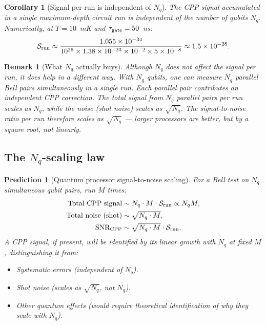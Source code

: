 \documentclass[11pt,letterpaper]{article}
\newtheorem{corollary}[theorem]{Corollary}
\newtheorem{remark}[theorem]{Remark}
\newtheorem{prediction}[theorem]{Prediction}
\begin{document}
\begin{corollary}[Signal per run is independent of $N_q$]
\label{cor:Nq_independent}
The CPP signal accumulated in a single maximum-depth circuit run is
independent of the number of qubits $N_q$.  Numerically, at
$T = 10$~mK and $\tau_{\rm gate} = 50$~ns:
\begin{equation}
\mathcal{S}_{\rm run} \approx
\frac{1.055\times10^{-34}}{10^{26} \times 1.38\times10^{-23}
\times 10^{-2} \times 5\times10^{-8}}
\approx 1.5 \times 10^{-28}.
\label{eq:Srun_numeric}
\end{equation}
\end{corollary}

\begin{remark}[What $N_q$ actually buys]
Although $N_q$ does not affect the signal per run, it does help
in a different way.  With $N_q$ qubits, one can measure $N_q$
parallel Bell pairs \emph{simultaneously} in a single run.  Each
parallel pair contributes an independent CPP correction.  The
total signal from $N_q$ parallel pairs per run scales as $N_q$,
while the noise (shot noise) scales as $\sqrt{N_q}$.  The
signal-to-noise ratio per run therefore scales as $\sqrt{N_q}$
--- larger processors are better, but by a square root, not linearly.
\end{remark}

\subsection{The $N_q$-scaling law}

\begin{prediction}[Quantum processor signal-to-noise scaling]
\label{pred:scaling}
For a Bell test on $N_q$ simultaneous qubit pairs, run $M$ times:
\begin{align}
\text{Total CPP signal} &\sim N_q \cdot M \cdot \mathcal{S}_{\rm run}
\propto N_q M, \label{eq:total_signal} \\
\text{Total noise (shot)} &\sim \sqrt{N_q \cdot M}, \label{eq:total_noise} \\
\text{SNR}_{\rm CPP} &\sim \sqrt{N_q \cdot M} \cdot \mathcal{S}_{\rm run}.
\label{eq:SNR}
\end{align}
A CPP signal, if present, will be identified by its \emph{linear
growth with $N_q$} at fixed $M$, distinguishing it from:
\begin{itemize}
\item Systematic errors (independent of $N_q$).
\item Shot noise (scales as $\sqrt{N_q}$, not $N_q$).
\item Other quantum effects (would require theoretical
  identification of why they scale with $N_q$).
\end{itemize}
\end{prediction}
\end{document}
